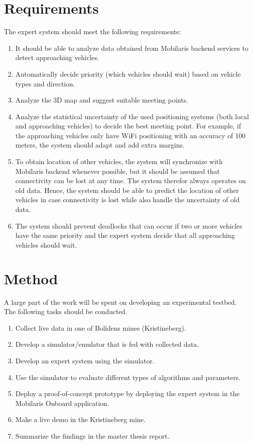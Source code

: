 \documentclass{article}
\begin{document}
\section*{Requirements}
The expert system should meet the following requirements:
\begin{enumerate}
  \item It should be able to analyze data obtained from Mobilaris backend services to detect approaching vehicles.
  \item Automatically decide priority (which vehicles should wait) based on vehicle types and direction.
  \item Analyze the 3D map and suggest suitable meeting points.
  \item Analyze the statistical uncertainty of the used positioning systems (both local and approaching vehicles) to decide the best meeting point. For example, if the approaching vehicles only have WiFi positioning with an accuracy of 100 meters, the system should adapt and add extra margins.
  \item To obtain location of other vehicles, the system will synchronize with Mobilaris backend whenever possible, but it should be assumed that connectivity can be lost at any time. The system therefor always operates on old data. Hence, the system should be able to predict the location of other vehicles in case connectivity is lost while also handle the uncertainty of old data.
  \item The system should prevent deadlocks that can occur if two or more vehicles have the same priority and the expert system decide that all approaching vehicles should wait.
\end{enumerate}

\section*{Method}
A large part of the work will be spent on developing an experimental testbed. The following tasks should be conducted.
\begin{enumerate}
  \item Collect live data in one of Bolidens mines (Kristineberg).
  \item Develop a simulator/emulator that is fed with collected data.
  \item Develop an expert system using the simulator.
  \item Use the simulator to evaluate different types of algorithms and parameters.
  \item Deploy a proof-of-concept prototype by deploying the expert system in the Mobilaris Onboard application.
  \item Make a live demo in the Kristineberg mine.
  \item Summarize the findings in the master thesis report.
\end{enumerate}
\end{document}
